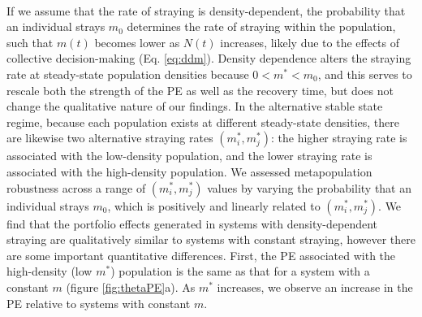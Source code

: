 \documentclass{revtex4}
\begin{document}
 \\
If we assume that the rate of straying is density-dependent, the probability that an individual strays $m_0$ determines the rate of straying within the population, such that $m(t)$ becomes lower as $N(t)$ increases, likely due to the effects of collective decision-making \citep{Berdahl:2016dx} (Eq. \ref{eq:ddm}).
Density dependence alters the straying rate at steady-state population densities because $0 < m^* < m_0$, and this serves to rescale both the strength of the PE as well as the recovery time, but does not change the qualitative nature of our findings.
In the alternative stable state regime, because each population exists at different steady-state densities, there are likewise two alternative straying rates $(m_i^*,m_j^*)$: the higher straying rate is associated with the low-density population, and the lower straying rate is associated with the high-density population.
We assessed metapopulation robustness across a range of $(m_i^*,m_j^*)$ values by varying the probability that an individual strays $m_0$, which is positively and linearly related to $(m_i^*,m_j^*)$.
We find that the portfolio effects generated in systems with density-dependent straying are qualitatively similar to systems with constant straying, however there are some important quantitative differences.
First, the PE associated with the high-density (low $m^*$) population is the same as that for a system with a constant $m$ (figure \ref{fig:thetaPE}a).
As $m^*$ increases, we observe an increase in the PE relative to systems with constant $m$.
\end{document}
